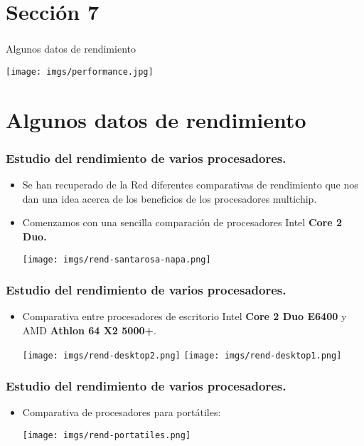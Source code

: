 \section*{Sección 7}
\frame
{
\frametitle{}
\begin{center}
\begin{huge}Algunos datos de rendimiento\newline\newline
\end{huge}
\texttt{[image: imgs/performance.jpg]}
\end{center}
}

\section{Algunos datos de rendimiento}
\frame
{
\frametitle{Estudio del rendimiento de varios procesadores.}
\begin{itemize}
 \item Se han recuperado de la Red diferentes comparativas de rendimiento que nos dan una idea acerca de los beneficios de los procesadores multichip.
 \item Comenzamos con una sencilla comparación de procesadores Intel \textbf{Core 2 Duo.}\newline
\begin{center}
\texttt{[image: imgs/rend-santarosa-napa.png]}
\end{center}
\end{itemize}
}

\frame
{
\frametitle{Estudio del rendimiento de varios procesadores.}
\begin{itemize}
 \item Comparativa entre procesadores de escritorio Intel \textbf{Core 2 Duo E6400} y AMD \textbf{Athlon 64 X2 5000+}.
\begin{center}
\texttt{[image: imgs/rend-desktop2.png]}\hspace*{1cm}
\texttt{[image: imgs/rend-desktop1.png]}
\end{center}
\end{itemize}
}

\frame
{
\frametitle{Estudio del rendimiento de varios procesadores.}
\begin{itemize}
 \item Comparativa de procesadores para portátiles:
\begin{center}
\texttt{[image: imgs/rend-portatiles.png]}
\end{center}
\end{itemize}
}

